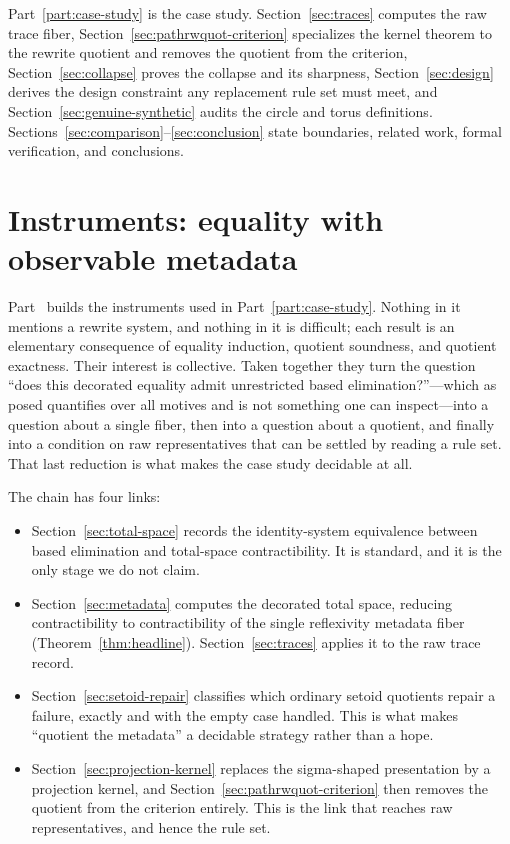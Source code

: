 \documentclass[10pt,reqno]{amsart}
\begin{document}
Part~\ref{part:case-study} is the case study.  Section~\ref{sec:traces} computes
the raw trace fiber, Section~\ref{sec:pathrwquot-criterion} specializes the
kernel theorem to the rewrite quotient and removes the quotient from the
criterion, Section~\ref{sec:collapse} proves the collapse and its sharpness,
Section~\ref{sec:design} derives the design constraint any replacement rule set
must meet, and Section~\ref{sec:genuine-synthetic} audits the circle and torus
definitions.  Sections~\ref{sec:comparison}--\ref{sec:conclusion} state
boundaries, related work, formal verification, and conclusions.

\part{Instruments: equality with observable metadata}
\label{part:general}

Part~\ref{part:general} builds the instruments used in
Part~\ref{part:case-study}.  Nothing in it mentions a rewrite system, and
nothing in it is difficult; each result is an elementary consequence of
equality induction, quotient soundness, and quotient exactness.  Their interest
is collective.  Taken together they turn the question ``does this decorated
equality admit unrestricted based elimination?''---which as posed quantifies
over all motives and is not something one can inspect---into a question about a
single fiber, then into a question about a quotient, and finally into a
condition on raw representatives that can be settled by reading a rule set.
That last reduction is what makes the case study decidable at all.

The chain has four links:

\begin{itemize}[leftmargin=1.35em]
\item Section~\ref{sec:total-space} records the identity-system equivalence
  between based elimination and total-space contractibility.  It is standard,
  and it is the only stage we do not claim.
\item Section~\ref{sec:metadata} computes the decorated total space, reducing
  contractibility to contractibility of the single reflexivity metadata fiber
  (Theorem~\ref{thm:headline}).  Section~\ref{sec:traces} applies it to the raw
  trace record.
\item Section~\ref{sec:setoid-repair} classifies which ordinary setoid
  quotients repair a failure, exactly and with the empty case handled.  This is
  what makes ``quotient the metadata'' a decidable strategy rather than a hope.
\item Section~\ref{sec:projection-kernel} replaces the sigma-shaped
  presentation by a projection kernel, and
  Section~\ref{sec:pathrwquot-criterion} then removes the quotient from the
  criterion entirely.  This is the link that reaches raw representatives, and
  hence the rule set.
\end{itemize}
\end{document}
